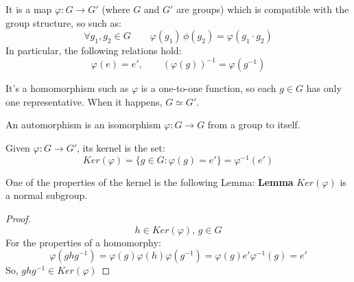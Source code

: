 \documentclass[../../main/main.tex]{subfiles}
\begin{document}
\begin{definition}[Homomorphism]
It is a map $\varphi: G \to G'$ (where $G$ and $G'$ are groups) which is compatible with the group structure, so such as:
\begin{equation*}
\forall g_1, g_2 \in G \qquad \varphi(g_1) \, \phi(g_2) = \varphi(g_1 \cdot g_2)
\end{equation*}
In particular, the following relations hold:
\begin{equation*}
\varphi(e) = e' , \qquad (\varphi(g))^{-1}=\varphi(g^{-1})
\end{equation*}
\end{definition}


\begin{definition}[Isomorphism]
It's a homomorphism such as $\varphi$ is a one-to-one function, so each $g \in G$ has only one representative. When it happens, $G \simeq G'$.
\end{definition}

\begin{definition}[Automorphism]
An automorphism is an isomorphism $\varphi: G \to G$ from a group to itself.
\end{definition}

\begin{definition}[Kernel]
Given $\varphi: G \to G'$, its kernel is the set: \newline
\begin{equation}
Ker(\varphi)=\{ g \in G : \varphi(g)=e' \} = \varphi^{-1}(e')
\end{equation}
\end{definition}

One of the properties of the kernel is the following Lemma:
\vspace{0.5\baselineskip}\newline
\textbf{Lemma} $ Ker(\varphi)$ is a normal subgroup.
\begin{proof}
\begin{equation*}
h \in Ker(\varphi), \, g \in G
\end{equation*}
For the properties of a homomorphy:
\begin{equation*}
\varphi(ghg^{-1}) = \varphi(g) \varphi(h) \varphi(g^{-1}) = \varphi(g) e' \varphi^{-1}(g) = e'
\end{equation*}
So, $ghg^{-1} \in Ker(\varphi)$
\end{proof}
\end{document}

